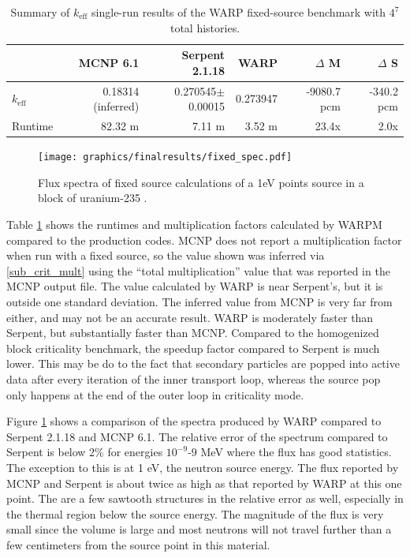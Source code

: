 \begin{table}[h]
\centering
\caption{Summary of $k_\mathrm{eff}$ single-run results of the WARP fixed-source benchmark with $4^7$ total histories.}
\label{fixed_summary}
\begin{tabular}{| l | r | r | r | r | r |}
 \hline
 & MCNP 6.1 & Serpent 2.1.18 & WARP & $\Delta$ M & $\Delta$ S  \\
\hline
\hline
 $k_\mathrm{eff}$ & 0.18314 (inferred) & 0.270545$\pm$0.00015 & 0.273947 & -9080.7 pcm & -340.2 pcm   \\
 \hline
 Runtime               & 82.32 m & 7.11 m &  3.52 m & 23.4x  & 2.0x  \\
 \hline
\end{tabular}
\end{table}

\begin{figure}[h!]
\centering
\texttt{[image: graphics/finalresults/fixed\_spec.pdf]}
\caption{Flux spectra of fixed source calculations of a 1eV points source in a block of uranium-235 . \label{fixed_spec} }
\end{figure}

Table \ref{fixed_summary} shows the runtimes and multiplication factors calculated by WARPM compared to the production codes.  MCNP does not report a multiplication factor when run with a fixed source, so the value shown was inferred via \eqref{sub_crit_mult} using the ``total multiplication'' value that was reported in the MCNP output file.  The value calculated by WARP is near Serpent's, but it is outside one standard deviation.  The inferred value from MCNP is very far from either, and may not be an accurate result.  WARP is moderately faster than Serpent, but substantially faster than MCNP.  Compared to the homogenized block criticality benchmark, the speedup factor compared to Serpent is much lower.  This may be do to the fact that secondary particles are popped into active data after every iteration of the inner transport loop, whereas the source pop only happens at the end of the outer loop in criticality mode.

Figure \ref{fixed_spec} shows a comparison of the spectra produced by WARP compared to Serpent 2.1.18 and MCNP 6.1.  The relative error of the spectrum compared to Serpent is below 2\% for energies $10^{-9}$-$9$ MeV where the flux has good statistics.  The exception to this is at 1 eV, the neutron source energy.  The flux reported by MCNP and Serpent is about twice as high as that reported by WARP at this one point.  The are a few sawtooth structures in the relative error as well, especially in the thermal region below the source energy.  The magnitude of the flux is very small since the volume is large and most neutrons will not travel further than a few centimeters from the source point in this material.

